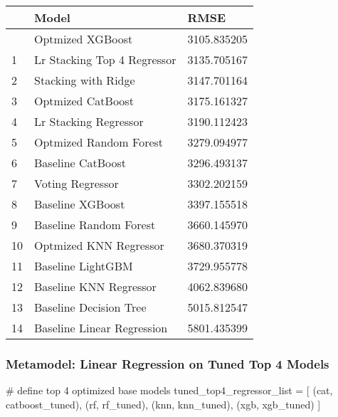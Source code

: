 \documentclass[
  letterpaper,
  DIV=11,
  numbers=noendperiod]{scrreprt}
\newenvironment{Shaded}{\begin{snugshade}}{\end{snugshade}}
\newcommand{\CommentTok}[1]{\textcolor[rgb]{0.37,0.37,0.37}{#1}}
\newcommand{\NormalTok}[1]{\textcolor[rgb]{0.00,0.23,0.31}{#1}}
\newcommand{\OperatorTok}[1]{\textcolor[rgb]{0.37,0.37,0.37}{#1}}
\newcommand{\StringTok}[1]{\textcolor[rgb]{0.13,0.47,0.30}{#1}}
\begin{document}
\begin{longtable}[]{@{}lll@{}}
\toprule\noalign{}
& Model & RMSE \\
\midrule\noalign{}
\endhead
\bottomrule\noalign{}
\endlastfoot
0 & Optmized XGBoost & 3105.835205 \\
1 & Lr Stacking Top 4 Regressor & 3135.705167 \\
2 & Stacking with Ridge & 3147.701164 \\
3 & Optmized CatBoost & 3175.161327 \\
4 & Lr Stacking Regressor & 3190.112423 \\
5 & Optmized Random Forest & 3279.094977 \\
6 & Baseline CatBoost & 3296.493137 \\
7 & Voting Regressor & 3302.202159 \\
8 & Baseline XGBoost & 3397.155518 \\
9 & Baseline Random Forest & 3660.145970 \\
10 & Optmized KNN Regressor & 3680.370319 \\
11 & Baseline LightGBM & 3729.955778 \\
12 & Baseline KNN Regressor & 4062.839680 \\
13 & Baseline Decision Tree & 5015.812547 \\
14 & Baseline Linear Regression & 5801.435399 \\
\end{longtable}

\subsubsection{Metamodel: Linear Regression on Tuned Top 4
Models}\label{metamodel-linear-regression-on-tuned-top-4-models}

\begin{Shaded}
\begin{Highlighting}[]
\CommentTok{\# define top 4 optimized base models}
\NormalTok{tuned\_top4\_regressor\_list }\OperatorTok{=}\NormalTok{ [}
\NormalTok{    (}\StringTok{\textquotesingle{}cat\textquotesingle{}}\NormalTok{, catboost\_tuned),}
\NormalTok{    (}\StringTok{\textquotesingle{}rf\textquotesingle{}}\NormalTok{, rf\_tuned),}
\NormalTok{    (}\StringTok{\textquotesingle{}knn\textquotesingle{}}\NormalTok{, knn\_tuned),}
\NormalTok{    (}\StringTok{\textquotesingle{}xgb\textquotesingle{}}\NormalTok{, xgb\_tuned)}
\NormalTok{]}
\end{Highlighting}
\end{Shaded}
\end{document}
